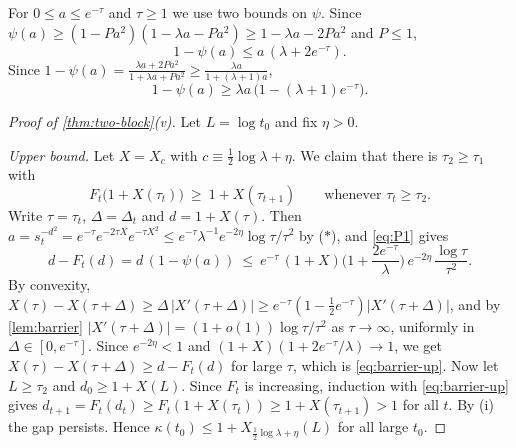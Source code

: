 For $0\le a\le e^{-\tau}$ and $\tau\ge1$ we use two bounds on $\psi$. Since $\psi(a)\ge(1-Pa^2)(1-\lambda a-Pa^2)\ge1-\lambda a-2Pa^2$ and $P\le1$,
\begin{equation}\label{eq:P1}
1-\psi(a)\le a\,(\lambda+2e^{-\tau}).
\end{equation}
Since $1-\psi(a)=\frac{\lambda a+2Pa^2}{1+\lambda a+Pa^2}\ge\frac{\lambda a}{1+(\lambda+1)a}$,
\begin{equation}\label{eq:P2}
1-\psi(a)\ge\lambda a\,\big(1-(\lambda+1)e^{-\tau}\big).
\end{equation}

\begin{proof}[Proof of \cref{thm:two-block}(v)]
Let $L=\log t_0$ and fix $\eta>0$.

\emph{Upper bound.} Let $X=X_c$ with $c\equiv\frac12\log\lambda+\eta$. We claim that there is $\tau_2\ge\tau_1$ with
\begin{equation}\label{eq:barrier-up}
F_t\big(1+X(\tau_t)\big)\ \ge\ 1+X(\tau_{t+1})\qquad\text{whenever }\tau_t\ge\tau_2 .
\end{equation}
Write $\tau=\tau_t$, $\Delta=\Delta_t$ and $d=1+X(\tau)$. Then $a=s_t^{-d^2}=e^{-\tau}e^{-2\tau X}e^{-\tau X^2}\le e^{-\tau}\lambda^{-1}e^{-2\eta}\log\tau/\tau^2$ by
($*$), and \eqref{eq:P1} gives
\[
d-F_t(d)=d\,(1-\psi(a))\ \le\ e^{-\tau}\,(1+X)\Big(1+\frac{2e^{-\tau}}{\lambda}\Big)\,e^{-2\eta}\,\frac{\log\tau}{\tau^2}.
\]
By convexity, $X(\tau)-X(\tau+\Delta)\ge\Delta\,|X'(\tau+\Delta)|\ge e^{-\tau}(1-\frac12e^{-\tau})|X'(\tau+\Delta)|$, and by \cref{lem:barrier}
$|X'(\tau+\Delta)|=(1+o(1))\log\tau/\tau^2$ as $\tau\to\infty$, uniformly in $\Delta\in[0,e^{-\tau}]$. Since $e^{-2\eta}<1$ and
$(1+X)(1+2e^{-\tau}/\lambda)\to1$, we get $X(\tau)-X(\tau+\Delta)\ge d-F_t(d)$ for large $\tau$, which is \eqref{eq:barrier-up}.
Now let $L\ge\tau_2$ and $d_0\ge1+X(L)$. Since $F_t$ is increasing, induction with \eqref{eq:barrier-up} gives
$d_{t+1}=F_t(d_t)\ge F_t(1+X(\tau_t))\ge1+X(\tau_{t+1})>1$ for all $t$. By (i) the gap persists. Hence
$\kappa(t_0)\le1+X_{\frac12\log\lambda+\eta}(L)$ for all large $t_0$.


\end{proof}
